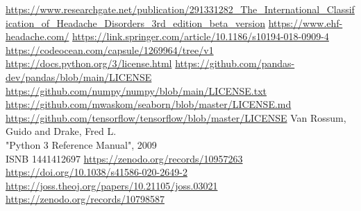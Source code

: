 \begin{thebibliography}{10}
     \url{https://www.researchgate.net/publication/291331282_The_International_Classification_of_Headache_Disorders_3rd_edition_beta_version}
     \url{https://www.ehf-headache.com/}
     \url{https://link.springer.com/article/10.1186/s10194-018-0909-4}
     \url{https://codeocean.com/capsule/1269964/tree/v1}
     \url{https://docs.python.org/3/license.html}
     \url{https://github.com/pandas-dev/pandas/blob/main/LICENSE}
     \url{https://github.com/numpy/numpy/blob/main/LICENSE.txt}
     \url{https://github.com/mwaskom/seaborn/blob/master/LICENSE.md}
     \url{https://github.com/tensorflow/tensorflow/blob/master/LICENSE}
     Van Rossum, Guido and Drake, Fred L.\\
    "Python 3 Reference Manual", 2009\\
    ISNB 1441412697
     \url{https://zenodo.org/records/10957263}
     \url{https://doi.org/10.1038/s41586-020-2649-2}
     \url{https://joss.theoj.org/papers/10.21105/joss.03021}
     \url{https://zenodo.org/records/10798587}
\end{thebibliography}